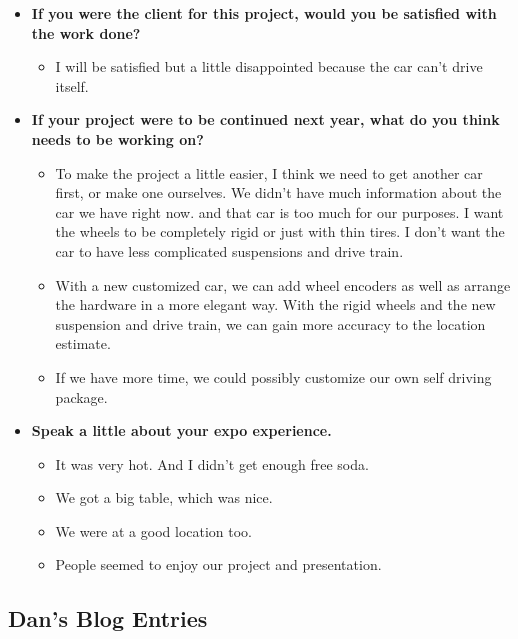\documentclass{article}
\begin{document}
\begin{itemize}
    \item{\textbf{If you were the client for this project, would you be satisfied with the work done?}}
    \begin{itemize}
      \item I will be satisfied but a little disappointed because the car can't drive itself.
    \end{itemize}

    \item{\textbf{If your project were to be continued next year, what do you think needs to be working on?}}
    \begin{itemize}
      \item To make the project a little easier, I think we need to get another car first,
      or make one ourselves. We didn't have much information about the car we have right
      now. and that car is too much for our purposes. I want the wheels to be completely
      rigid or just with thin tires. I don't want the car to have less complicated
      suspensions and drive train.
      \item With a new customized car, we can add wheel encoders as well as arrange the
      hardware in a more elegant way. With the rigid wheels and the new suspension and
      drive train, we can gain more accuracy to the location estimate.
      \item If we have more time, we could possibly customize our own self driving package.
    \end{itemize}

    \item{\textbf{Speak a little about your expo experience.}}
    \begin{itemize}
      \item It was very hot. And I didn't get enough free soda.
      \item We got a big table, which was nice.
      \item We were at a good location too.
      \item People seemed to enjoy our project and presentation.
    \end{itemize}

\end{itemize}

\subsection{Dan's Blog Entries}
\end{document}
